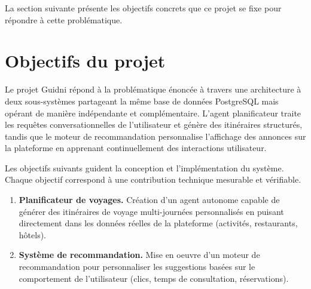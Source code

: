 \vspace{0.5cm}
\noindent
{}
\vspace{0.5cm}

La section suivante présente les objectifs concrets que ce projet se fixe pour répondre à cette
problématique.


\section{Objectifs du projet}

Le projet Guidni répond à la problématique énoncée à travers une architecture à deux sous-systèmes
partageant la même base de données PostgreSQL mais opérant de manière indépendante et complémentaire.
L'agent planificateur traite les requêtes conversationnelles de l'utilisateur et génère des itinéraires
structurés, tandis que le moteur de recommandation personnalise l'affichage des annonces sur la
plateforme en apprenant continuellement des interactions utilisateur.

Les objectifs suivants guident la conception et l'implémentation du système. Chaque objectif
correspond à une contribution technique mesurable et vérifiable.

\begin{enumerate}
    \item \textbf{Planificateur de voyages.} Création d'un agent autonome capable de générer des 
    itinéraires de voyage multi-journées personnalisés en puisant directement dans les données réelles 
    de la plateforme (activités, restaurants, hôtels).

    \item \textbf{Système de recommandation.} Mise en oeuvre d'un moteur de recommandation 
    pour personnaliser les suggestions basées sur le comportement de l'utilisateur (clics, temps de consultation, 
    réservations).

\end{enumerate}

